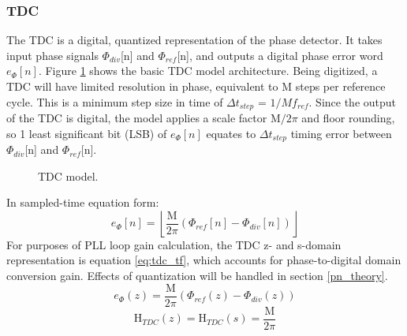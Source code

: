 \subsubsection{TDC}
	The TDC is a digital, quantized representation of the phase detector. It takes input phase signals $\Phi_{div}$[n] and $\Phi_{ref}$[n], and outputs a digital phase error word $e_\Phi[n]$. Figure \ref{fig:tdc} shows the basic TDC model architecture. Being digitized, a TDC will have limited resolution in phase, equivalent to M steps per reference cycle. This is a minimum step size in time of $\Delta t_{step}$ = $1/Mf_{ref}$. Since the output of the TDC is digital, the model applies a scale factor M$/2\pi$ and floor rounding, so 1 least significant bit (LSB) of $e_\Phi[n]$ equates to $\Delta t_{step}$ timing error  between $\Phi_{div}$[n] and $\Phi_{ref}$[n].
	\begin{figure}[htb!]
		\center
		\caption{TDC model.}
		\label{fig:tdc}
	\end{figure}
	\FloatBarrier
	In sampled-time equation form:
	\begin{equation}
		e_\Phi[n] = \left\lfloor\frac{\mathrm{M}}{2\pi}(\Phi_{ref}[n] - \Phi_{div}[n])\right\rfloor
	\end{equation}
	For purposes of PLL loop gain calculation, the TDC z- and s-domain representation is equation \ref{eq:tdc_tf}, which accounts for phase-to-digital domain conversion gain. Effects of quantization will be handled in section \ref{pn_theory}.
	\begin{equation}
		e_\Phi(z) = \frac{\mathrm{M}}{2\pi}(\Phi_{ref}(z) - \Phi_{div}(z))
	\end{equation}	
	\begin{equation}\label{eq:tdc_tf}
		\mathrm{H}_{TDC}(z) = \mathrm{H}_{TDC}(s) = \frac{\mathrm{M}}{2\pi}
	\end{equation}	
	\FloatBarrier

